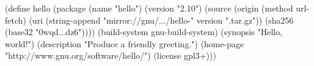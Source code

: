 \documentclass{beamer}
\begin{document}
\begin{frame}[fragile]
  \begin{semiverbatim}
(define hello
  (\alert{package}
   (name "hello")
   (version "2.10")
   (source (\alert{origin}
            (method url-fetch)
            (uri (string-append
                  "mirror://gnu/\textrm{...}/hello-" version
                  ".tar.gz"))
            (sha256 (base32 "0wqd\textrm{...}dz6"))))
   (\alert{build-system} gnu-build-system)
   (synopsis "Hello, world!")
   (description "Produce a friendly greeting.")
   (home-page "http://www.gnu.org/software/hello/")
   (license gpl3+)))
  \end{semiverbatim}

\end{frame}
\end{document}
